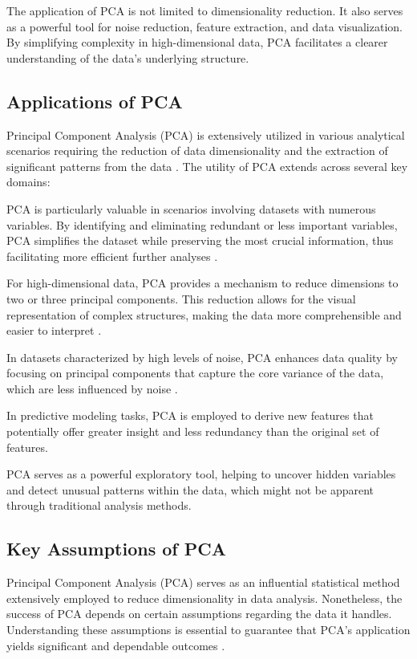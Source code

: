 \documentclass[sigconf]{acmart}
\begin{document}
The application of PCA is not limited to dimensionality reduction. It also serves as a powerful tool for noise reduction, feature extraction, and data visualization. By simplifying complexity in high-dimensional data, PCA facilitates a clearer understanding of the data's underlying structure.

\subsection{Applications of PCA}

Principal Component Analysis (PCA) is extensively utilized in various analytical scenarios requiring the reduction of data dimensionality and the extraction of significant patterns from the data \cite{wang2003feature}. The utility of PCA extends across several key domains:

PCA is particularly valuable in scenarios involving datasets with numerous variables. By identifying and eliminating redundant or less important variables, PCA simplifies the dataset while preserving the most crucial information, thus facilitating more efficient further analyses \cite{wu2007feature}.

For high-dimensional data, PCA provides a mechanism to reduce dimensions to two or three principal components. This reduction allows for the visual representation of complex structures, making the data more comprehensible and easier to interpret \cite{hasan2021review}.

In datasets characterized by high levels of noise, PCA enhances data quality by focusing on principal components that capture the core variance of the data, which are less influenced by noise \cite{ivosev2008dimensionality}.

In predictive modeling tasks, PCA is employed to derive new features that potentially offer greater insight and less redundancy than the original set of features.

PCA serves as a powerful exploratory tool, helping to uncover hidden variables and detect unusual patterns within the data, which might not be apparent through traditional analysis methods.



\subsection{Key Assumptions of PCA}
Principal Component Analysis (PCA) serves as an influential statistical method extensively employed to reduce dimensionality in data analysis. Nonetheless, the success of PCA depends on certain assumptions regarding the data it handles. Understanding these assumptions is essential to guarantee that PCA's application yields significant and dependable outcomes \cite{bro2014principal, shlens2014tutorial, wold1987principal, candes2011robust, mckeown1998independent}.
\end{document}
